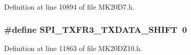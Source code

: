 Definition at line 10894 of file M\+K20\+D7.\+h.

\subsubsection[{\texorpdfstring{S\+P\+I\+\_\+\+T\+X\+F\+R3\+\_\+\+T\+X\+D\+A\+T\+A\+\_\+\+S\+H\+I\+FT}{SPI_TXFR3_TXDATA_SHIFT}}]{\setlength{\rightskip}{0pt plus 5cm}\#define S\+P\+I\+\_\+\+T\+X\+F\+R3\+\_\+\+T\+X\+D\+A\+T\+A\+\_\+\+S\+H\+I\+FT~0}\hypertarget{group___s_p_i___register___masks_ga13d115127f0f26ef2f4afac9d4fcafd9}{}\label{group___s_p_i___register___masks_ga13d115127f0f26ef2f4afac9d4fcafd9}


Definition at line 11863 of file M\+K20\+D\+Z10.\+h.

